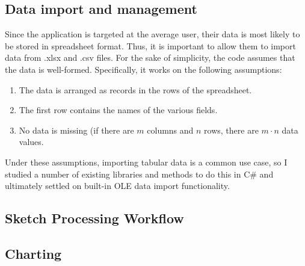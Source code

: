 	\subsection{Data import and management}
		Since the application is targeted at the average user, their data is most likely to be stored in spreadsheet format. Thus, it is important to allow them to import data from .xlsx and .csv files. 
		For the sake of simplicity, the code assumes that the data is well-formed. Specifically, it works on the following assumptions:
		\begin{enumerate}
		\item The data is arranged as records in the rows of the spreadsheet.
		\item The first row contains the names of the various fields.
		\item No data is missing (if there are $m$ columns and $n$ rows, there are $m \cdot n$ data values.
		\end{enumerate}
		
		Under these assumptions, importing tabular data is a common use case, so I studied a number of existing libraries and methods to do this in C\# and ultimately settled on built-in OLE data import functionality. 
	\subsection{Sketch Processing Workflow}
	\subsection{Charting}
	